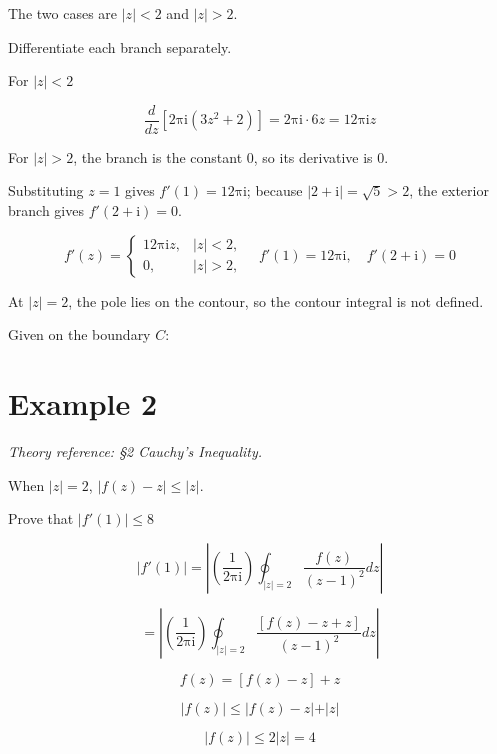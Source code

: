 \documentclass[11pt,a4paper]{article}
\theoremstyle{definition}
\theoremstyle{plain}
\begin{document}
The two cases are $\vert{}z\vert{} < 2$ and $\vert{}z\vert{} > 2$.

Differentiate each branch separately.

For $\vert{}z\vert{} < 2$

\[
\frac{d}{dz}\left[2\mathrm{\pi}\mathrm{i}(3z^{2} + 2)\right] = 2\mathrm{\pi}\mathrm{i} \cdot 6z = 12\mathrm{\pi}\mathrm{i}z
\]

For $\vert{}z\vert{} > 2$, the branch is the constant 0, so its derivative is 0.

Substituting $z = 1$ gives $f'(1) = 12\mathrm{\pi}\mathrm{i}$; because $\vert{}2 + \mathrm{i}\vert{} = \sqrt{5} > 2$, the exterior branch gives $f'(2 + \mathrm{i}) = 0$.

\begin{equation}
f'(z) = \begin{cases} 12\mathrm{\pi}\mathrm{i}z, & \vert{}z\vert{} < 2, \\ 0, & \vert{}z\vert{} > 2, \end{cases}\quad f'(1) = 12\mathrm{\pi}\mathrm{i}, \quad f'(2 + \mathrm{i}) = 0
\end{equation}

At $\vert{}z\vert{} = 2$, the pole lies on the contour, so the contour integral is not defined.

Given on the boundary $C$:

\section*{Example 2}

\textit{Theory reference: §2 Cauchy's Inequality.}

When $\vert{}z\vert{} = 2$, $\vert{}f(z) - z\vert{} \le \vert{}z\vert{}$.

Prove that $\vert{}f'(1)\vert{} \le 8$

\begin{equation}
\vert{}f'(1)\vert{} = \left\vert{}\left(\frac{1}{2\mathrm{\pi}\mathrm{i}}\right)\oint_{\vert{}z\vert{} = 2}\frac{f(z)}{(z - 1)^{2}}dz\right\vert{}
\end{equation}

\[
= \left\vert{}\left(\frac{1}{2\mathrm{\pi}\mathrm{i}}\right)\oint_{\vert{}z\vert{} = 2}\frac{[f(z) - z + z]}{(z - 1)^{2}}dz\right\vert{}
\]

\[
f(z) = [f(z) - z] + z
\]

\[
\vert{}f(z)\vert{} \le \vert{}f(z) - z\vert{} + \vert{}z\vert{}
\]

\[
\vert{}f(z)\vert{} \le 2\vert{}z\vert{} = 4
\]
\end{document}
